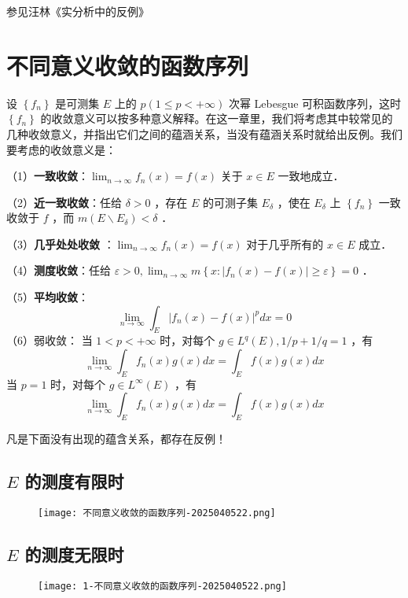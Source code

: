 参见汪林《实分析中的反例》

\section{不同意义收敛的函数序列}

设 $\left\{f_n\right\}$ 是可测集 $E$ 上的 $p(1 \leqslant p<+\infty)$ 次幂 Lebesgue 可积函数序列，这时 $\left\{f_n\right\}$ 的收敛意义可以按多种意义解释。在这一章里，我们将考虑其中较常见的几种收敛意义，并指出它们之间的蕴涵关系，当没有蕴涵关系时就给出反例。我们要考虑的收敛意义是：

（1）\textbf{一致收敛}：$\lim _{n \rightarrow \infty} f_n(x)=f(x)$ 关于 $x \in E$ 一致地成立．

（2）\textbf{近一致收敛}：任给 $\delta>0$ ，存在 $E$ 的可测子集 $E_\delta$ ，使在 $E_\delta$ 上 $\left\{f_n\right\}$ 一致收敛于 $f$ ，而 $m\left(E \backslash E_\delta\right)<\delta$ ．

（3）\textbf{几乎处处收敛} ：$\lim _{n \rightarrow \infty} f_n(x)=f(x)$ 对于几乎所有的 $x \in E$ 成立．

（4）\textbf{测度收敛}：任给 $\varepsilon>0, \lim _{n \rightarrow \infty} m\left\{x:\left|f_n(x)-f(x)\right| \geqslant \varepsilon\right\}=0$ ．

（5）\textbf{平均收敛}：
\[
\lim _{n \rightarrow \infty} \int_E\left|f_n(x)-f(x)\right|^p d x=0
\]
（6）弱收敛：
当 $1<p<+\infty$ 时，对每个 $g \in L^q(E), 1 / p+1 / q=1$ ，有
\[
\lim _{n \rightarrow \infty} \int_E f_n(x) g(x) d x=\int_E f(x) g(x) d x
\]
当 $p=1$ 时，对每个 $g \in L^{\infty}(E)$ ，有
\[
\lim _{n \rightarrow \infty} \int_E f_n(x) g(x) d x=\int_E f(x) g(x) d x
\]
\begin{remark}
凡是下面没有出现的蕴含关系，都存在反例！
\end{remark}
\subsection{\texorpdfstring{$E$}{E} 的测度有限时}

\begin{figure}[H]
\centering
\texttt{[image: 不同意义收敛的函数序列-2025040522.png]}
\label{}
\end{figure}

\subsection{\texorpdfstring{$E$}{E} 的测度无限时}

\begin{figure}[H]
\centering
\texttt{[image: 1-不同意义收敛的函数序列-2025040522.png]}
\label{}
\end{figure}
